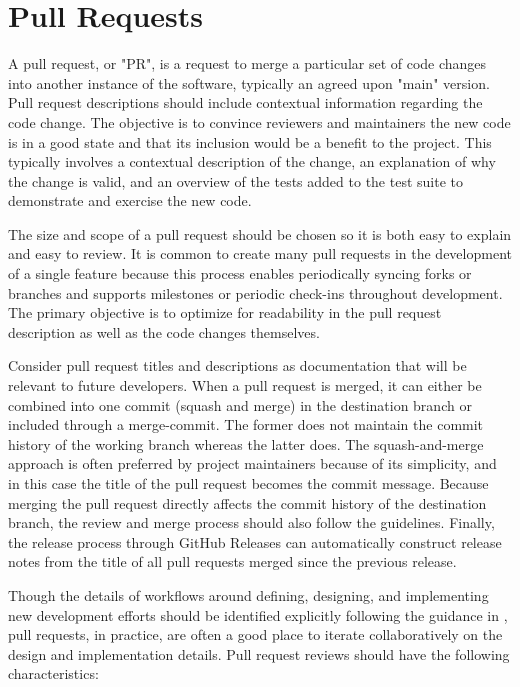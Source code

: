 \documentclass[]{nrel}
\begin{document}
\section{Pull Requests}
A pull request, or "PR", is a request to merge a particular set of code changes into another
instance of the software, typically an agreed upon "main" version.
Pull request descriptions should include contextual information regarding the code change.
The objective is to convince reviewers and maintainers the new code is in a good state
and that its inclusion would be a benefit to the project. This typically involves a contextual
description of the change, an explanation of why the change is valid, and an overview of the
tests added to the test suite to demonstrate and exercise the new code.

The size and scope of a pull request should be chosen so it is both easy to explain and
easy to review.
It is common to create many pull requests in the development of a single
feature because this process enables periodically syncing forks or branches and supports
milestones or periodic check-ins throughout development.
The primary objective is to optimize for readability in the pull request description as well as
the code changes themselves.

Consider pull request titles and descriptions as documentation that will be relevant to
future developers.
When a pull request is merged, it can either be combined into one commit (squash and merge)
in the destination branch or included through a merge-commit.
The former does not maintain the commit history of the working branch whereas the latter does.
The squash-and-merge approach is often preferred by project maintainers because of its simplicity,
and in this case the title of the pull request becomes the commit message.
Because merging the pull request directly affects the commit history of the destination branch,
the review and merge process should also follow the  guidelines.
Finally, the release process through GitHub Releases can automatically construct
release notes from the title of all pull requests merged since the previous release.

Though the details of workflows around defining, designing, and implementing new development
efforts should be identified explicitly following the guidance in , pull requests,
in practice, are often a good place to iterate collaboratively on the design and implementation
details.
Pull request reviews should have the following characteristics:
\end{document}
